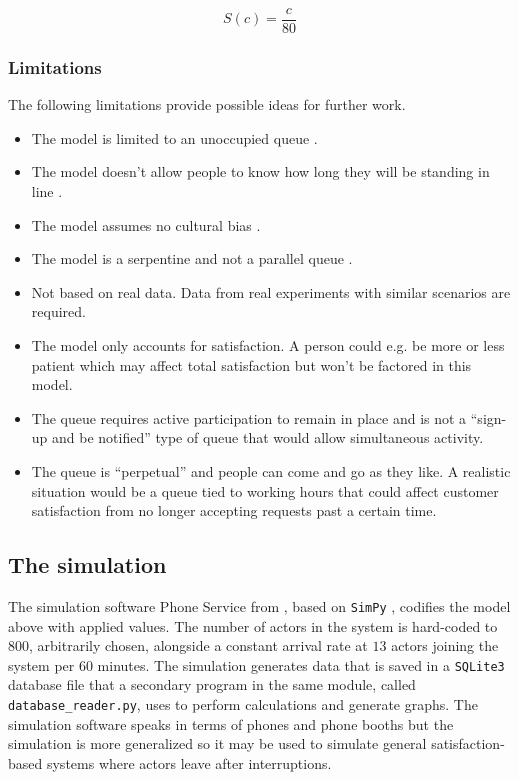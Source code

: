 \documentclass[conference]{IEEEtran}
\begin{document}
\begin{equation}
    S(c) = \frac{c}{80}
    \label{eq:service-rate}
\end{equation}

\subsubsection{Limitations}

The following limitations provide possible ideas for further work.

\begin{itemize}
    \item The model is limited to an unoccupied queue
        \cite{NeuroLaunchMakingSomeoneWait}.
    \item The model doesn't allow people to know how long they
        will be standing in line \cite{NeuroLaunchMakingSomeoneWait}.
    \item The model assumes no cultural bias
        \cite{NeuroLaunchMakingSomeoneWait}.
    \item The model is a serpentine and not a parallel queue
        \cite{NeuroLaunchMakingSomeoneWait}.
    \item Not based on real data. Data from real experiments with
        similar scenarios are required.
    \item The model only accounts for satisfaction. A person
        could e.g. be more or less patient which may affect total
        satisfaction but won't be factored in this model.
    \item The queue requires active participation to remain in
        place and is not a ``sign-up and be notified'' type of
        queue that would allow simultaneous activity.
    \item The queue is ``perpetual'' and people can come and go
        as they like. A realistic situation would be a queue tied
        to working hours that could affect customer satisfaction
        from no longer accepting requests past a certain time.
\end{itemize}

\subsection{The simulation}

The simulation software Phone Service from
\cite{AvekvistLorentzonDta400}, based on \verb|SimPy| \cite{SimPy},
codifies the model above with applied values. The number of actors
in the system is hard-coded to $800$, arbitrarily chosen, alongside
a constant arrival rate at $13$ actors joining the system per $60$
minutes. The simulation generates data that is saved in a
\verb|SQLite3| \cite{SQLite3} database file that a secondary
program in the same module, called \verb|database_reader.py|, uses
to perform calculations and generate graphs. The simulation
software speaks in terms of phones and phone booths but the
simulation is more generalized so it may be used to simulate
general satisfaction-based systems where actors leave after
interruptions.
\end{document}
